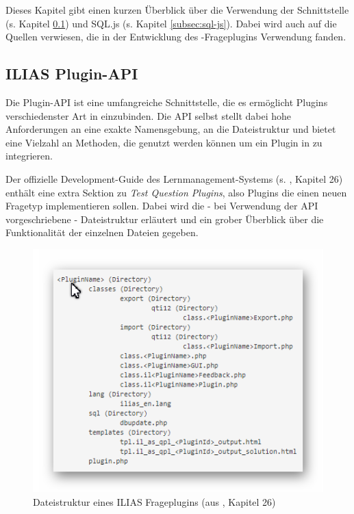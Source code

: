Dieses Kapitel gibt einen kurzen Überblick über die Verwendung der  Schnittstelle (s. Kapitel \ref{subsec:ilias-plugin-api}) und SQL.js (s. Kapitel \ref{subsec:sql-js}). Dabei wird auch auf die Quellen verwiesen, die in der Entwicklung des -Frageplugins Verwendung fanden. 

\subsection{ILIAS Plugin-API}
\label{subsec:ilias-plugin-api}
    Die  Plugin-API ist eine umfangreiche Schnittstelle, die es ermöglicht Plugins verschiedenster Art in  einzubinden. Die API selbst stellt dabei hohe Anforderungen an eine exakte Namensgebung, an die Dateistruktur und bietet eine Vielzahl an Methoden, die genutzt werden können um ein Plugin in  zu integrieren. 
    
    Der offizielle Development-Guide des Lernmanagement-Systems  (s. \cite{IliasDevelopmentGuide}, Kapitel 26) enthält eine extra Sektion zu \glqq\textit{Test Question Plugins}\grqq , also Plugins die einen neuen Fragetyp implementieren sollen. Dabei wird die - bei Verwendung der API vorgeschriebene - Dateistruktur erläutert und ein grober Überblick über die Funktionalität der einzelnen Dateien gegeben.
    
    \begin{figure}[H]
        \begin{center}
            \includegraphics[page=1, width=0.3\paperwidth, trim=4 4 4 4, clip]{fig/ILIAS-Dateistruktur.png} 
            \caption{Dateistruktur eines ILIAS Frageplugins (aus \cite{IliasDevelopmentGuide}, Kapitel 26)}
            \label{fig:ilias-dateistruktur}
        \end{center}
    \end{figure}
    

